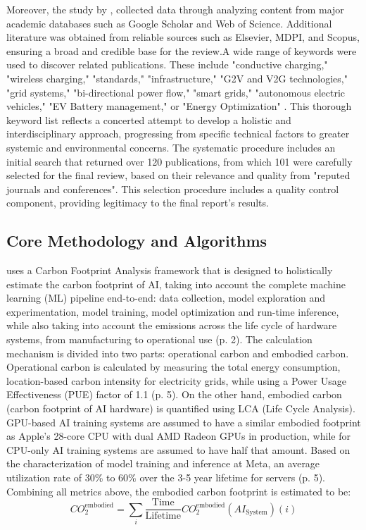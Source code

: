 \documentclass[a4paper, 12pt]{article}
\begin{document}
Moreover, the study by \citet{M.rauf2024}, collected data through analyzing content from major academic databases such as Google Scholar and Web of Science. Additional literature was obtained from reliable sources such as Elsevier, MDPI, and Scopus, ensuring a broad and credible base for the review.A wide range of keywords were used to discover related publications.  These include "conductive charging," "wireless charging," "standards," "infrastructure," "G2V and V2G technologies," "grid systems," "bi-directional power flow," "smart grids," "autonomous electric vehicles," "EV Battery management," or "Energy Optimization" .  This thorough keyword list reflects a concerted attempt to develop a holistic and interdisciplinary approach, progressing from specific technical factors to greater systemic and environmental concerns.  The systematic procedure includes an initial search that returned over 120 publications, from which 101 were carefully selected for the final review, based on their relevance and quality from "reputed journals and conferences".  This selection procedure includes a quality control component, providing legitimacy to the final report's results.

\subsection{Core Methodology and Algorithms} 
\citet{Wu2022} uses a Carbon Footprint Analysis framework that is designed to holistically estimate the carbon footprint of AI, taking into account the complete machine learning (ML) pipeline end-to-end: data collection, model exploration and experimentation, model training, model optimization and run-time inference, while also taking into account the emissions across the life cycle of hardware systems, from manufacturing to operational use (p. 2). The calculation mechanism is divided into two parts: operational carbon and embodied carbon. Operational carbon is calculated by measuring the total energy consumption, location-based carbon intensity for electricity grids, while using a Power Usage Effectiveness (PUE) factor of 1.1 (p. 5). On the other hand, embodied carbon (carbon footprint of AI hardware) is quantified using LCA (Life Cycle Analysis). GPU-based AI training systems are assumed to have a similar embodied footprint as Apple's 28-core CPU with dual AMD Radeon GPUs in production, while for CPU-only AI training systems are assumed to have half that amount.  Based on the characterization of model training and inference at Meta, an average utilization rate of 30\% to 60\% over the 3-5 year lifetime for servers (p. 5). Combining all metrics above, the embodied carbon footprint is estimated to be: 
\begin{equation}
	CO_2^{\text{embodied}} = \sum_i \frac{\text{Time}}{\text{Lifetime}} CO_2^{\text{embodied}}(AI_{\text{System}})(i)
\end{equation}
\end{document}
